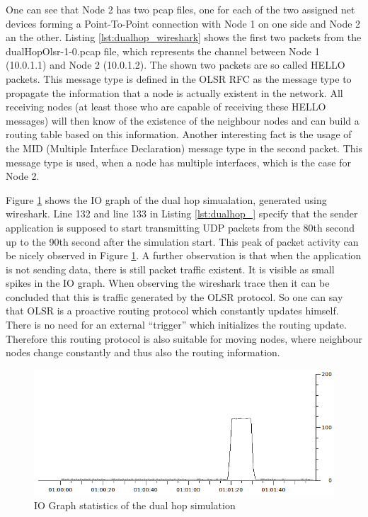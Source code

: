 One can see that Node 2 has two pcap files, one for each of the two
assigned net devices forming a Point-To-Point connection with Node
1 on one side and Node 2 an the other. Listing \ref{lst:dualhop_wireshark}
shows the first two packets from the dualHopOlsr-1-0.pcap file, which
represents the channel between Node 1 (10.0.1.1) and Node 2 (10.0.1.2).
The shown two packets are so called HELLO packets. This message type
is defined in the OLSR RFC \cite{rfc3626} as the message type to
propagate the information that a node is actually existent in the
network. All receiving nodes (at least those who are capable of receiving
these HELLO messages) will then know of the existence of the neighbour
nodes and can build a routing table based on this information. Another
interesting fact is the usage of the MID (Multiple Interface Declaration)
message type in the second packet. This message type is used, when
a node has multiple interfaces, which is the case for Node 2. \texttt{\small }{\small \par}

Figure \ref{fig:IO-Graph-statistics} shows the IO graph of the dual
hop simualation, generated using wireshark. Line 132 and line 133
in Listing \ref{lst:dualhop_} specify that the sender application
is supposed to start transmitting UDP packets from the 80th second
up to the 90th second after the simulation start. This peak of packet
activity can be nicely observed in Figure \ref{fig:IO-Graph-statistics}.
A further observation is that when the application is not sending
data, there is still packet traffic existent. It is visible as small
spikes in the IO graph. When observing the wireshark trace then it
can be concluded that this is traffic generated by the OLSR protocol.
So one can say that OLSR is a proactive routing protocol which constantly
updates himself. There is no need for an external {}``trigger''
which initializes the routing update. Therefore this routing protocol
is also suitable for moving nodes, where neighbour nodes change constantly
and thus also the routing information.

%
\begin{figure}
\begin{centering}
\includegraphics[width=0.7\paperwidth]{src/results/dualHopOlsr}
\par\end{centering}

\caption{\label{fig:IO-Graph-statistics}IO Graph statistics of the dual hop
simulation}

\end{figure}

